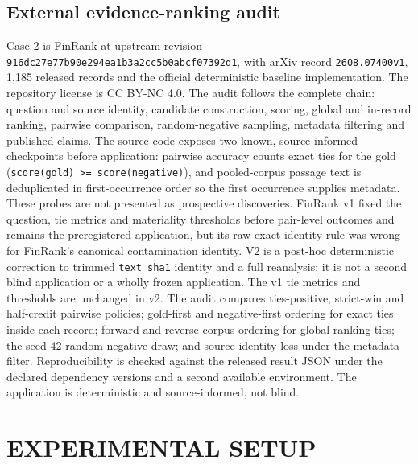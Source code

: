 \documentclass[a4paper,twoside]{article}
\begin{document}
\subsection{External evidence-ranking audit}
Case 2 is FinRank at upstream revision \texttt{916dc27e77b90e294ea1b3a2cc5b0abcf07392d1}, with arXiv record \texttt{2608.07400v1}, 1,185 released records and the official deterministic baseline implementation. The repository license is CC BY-NC 4.0. The audit follows the complete chain: question and source identity, candidate construction, scoring, global and in-record ranking, pairwise comparison, random-negative sampling, metadata filtering and published claims.
The source code exposes two known, source-informed checkpoints before application: pairwise accuracy counts exact ties for the gold (\texttt{score(gold) >= score(negative)}), and pooled-corpus passage text is deduplicated in first-occurrence order so the first occurrence supplies metadata. These probes are not presented as prospective discoveries. FinRank v1 fixed the question, tie metrics and materiality thresholds before pair-level outcomes and remains the preregistered application, but its raw-exact identity rule was wrong for FinRank's canonical contamination identity. V2 is a post-hoc deterministic correction to trimmed \texttt{text\_sha1} identity and a full reanalysis; it is not a second blind application or a wholly frozen application. The v1 tie metrics and thresholds are unchanged in v2.
The audit compares ties-positive, strict-win and half-credit pairwise policies; gold-first and negative-first ordering for exact ties inside each record; forward and reverse corpus ordering for global ranking ties; the seed-42 random-negative draw; and source-identity loss under the metadata filter. Reproducibility is checked against the released result JSON under the declared dependency versions and a second available environment. The application is deterministic and source-informed, not blind.
\section{\uppercase{Experimental Setup}}
\end{document}
